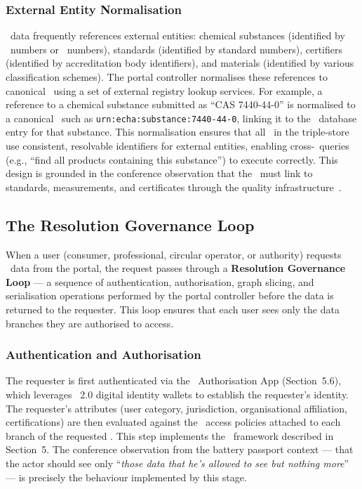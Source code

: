 \subsubsection{External Entity Normalisation}

\DPP\ data frequently references external entities: chemical substances
(identified by \CAS\ numbers or \EC\ numbers), standards (identified by standard
numbers), certifiers (identified by accreditation body identifiers), and
materials (identified by various classification schemes). The portal controller
normalises these references to canonical \IRIs\ using a set of external registry
lookup services. For example, a reference to a chemical substance submitted as
``CAS 7440-44-0'' is normalised to a canonical \IRI\ such as
\texttt{urn:echa:substance:7440-44-0}, linking it to the \ECHA\ database entry
for that substance. This normalisation ensures that all \DPPs\ in the
triple-store use consistent, resolvable identifiers for external entities,
enabling cross-\DPP\ queries (e.g., ``find all products containing this
substance'') to execute correctly. This design is grounded in the conference
observation that the \DPP\ must link to standards, measurements, and
certificates through the quality infrastructure~\cite{dpp4eu2026_day1}.

\subsection{The Resolution Governance Loop}

When a user (consumer, professional, circular operator, or authority) requests
\DPP\ data from the portal, the request passes through a \textbf{Resolution
Governance Loop} --- a sequence of authentication, authorisation, graph slicing,
and serialisation operations performed by the portal controller before the data
is returned to the requester. This loop ensures that each user sees only the
data branches they are authorised to access.

\subsubsection{Authentication and Authorisation}

The requester is first authenticated via the \EC\ Authorisation App
(Section~5.6), which leverages \eIDAS~2.0 digital identity wallets to establish
the requester's identity. The requester's attributes (user category,
jurisdiction, organisational affiliation, certifications) are then evaluated
against the \ODRL\ access policies attached to each branch of the requested
\DPP. This step implements the \ABAC\ framework described in Section~5. The
conference observation from the battery passport context --- that the actor
should see only ``\textit{those data that he's allowed to see but nothing
more}''~\cite{dpp4eu2026_day2} --- is precisely the behaviour implemented by
this stage.

